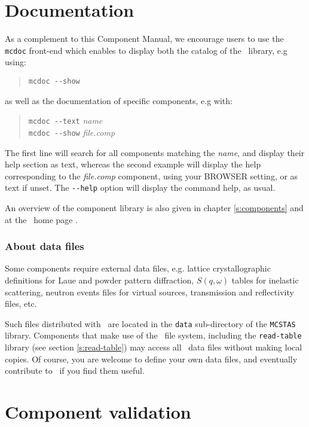 \section{Documentation}
As a complement to this Component Manual, we encourage users to use
the \verb+mcdoc+ front-end which enables to display both the
catalog of the \MCS\ library, e.g using: 
\begin{quote}
  \verb|mcdoc --show|
\end{quote}
as well as the documentation of specific components, e.g with:
\begin{quote}
  \verb|mcdoc --text| {\it name} \\
  \verb|mcdoc --show| {\it file.comp}
\end{quote}
The first line will search for all components matching the {\it name},
and display their help section as text,
whereas the second example will display the help corresponding to
the {\it file.comp} component, using your
BROWSER setting, or as text if unset.
The \verb+--help+ option will display the command help, as usual.

An overview of the component library is also given 
in chapter \ref{s:components} and at the \MCS\ home page \cite{mcstas_webpage}.

\subsubsection{About data files}
Some components require external data files, 
e.g. lattice crystallographic definitions for Laue and powder pattern diffraction,
$S(q,\omega)$ tables for inelastic scattering, 
neutron events files for virtual sources, 
transmission and reflectivity files, etc.

Such files distributed with \MCS\ are located in the 
\verb+data+ sub-directory of the \verb+MCSTAS+ library. 
Components that make use of the \MCS\ file system, 
including the \verb+read-table+ library (see section \ref{s:read-table}) 
may access all \MCS\ data files without making local copies. 
Of course, you are welcome to define your own data files, 
and eventually contribute to \MCS\ if you find them useful.


\section{Component validation}


